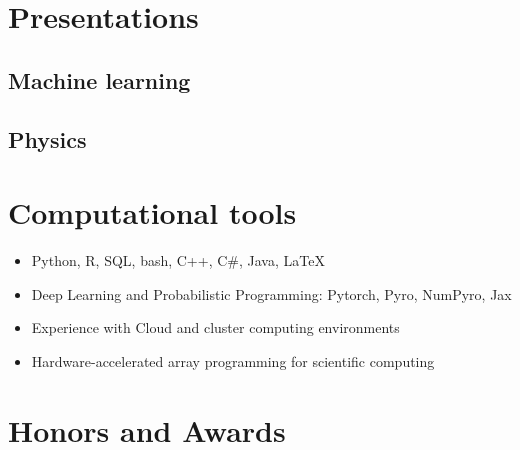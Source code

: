 \documentclass[11pt,letterpaper,roman]{moderncv}        %
\begin{document}
\section{Presentations}
\subsection{Machine learning}

\begin{refsection}
  \nocite{*}
  \printbibliography[heading=none]
\end{refsection}

\subsection{Physics}
\begin{refsection}
  \nocite{*}
  \printbibliography[heading=none]
\end{refsection}

\section{Computational tools}
\begin{itemize}
\item Python, R, SQL, bash, C++, C\#, Java, LaTeX
\item Deep Learning and Probabilistic Programming: Pytorch, Pyro, NumPyro, Jax
\item Experience with Cloud and cluster computing environments
\item Hardware-accelerated array programming for scientific computing
\end{itemize}

\section{Honors and Awards}


\clearpage
\end{document}
